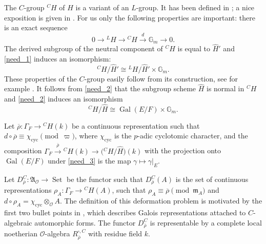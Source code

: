 \documentclass{amsart}
\theoremstyle{definition}
\theoremstyle{remark}
\DeclareMathOperator{\Gal}{Gal}
\DeclareMathOperator{\Set}{Set}
\newcommand{\Aa}{\mathfrak A}
\newcommand{\mm}{\mathfrak m}
\newcommand{\OO}{\mathcal O}
\newcommand{\rhobar}{\overline{\rho}}
\newcommand{\Gm}{\mathbb G_{m}}
\newcommand{\cyc}{\mathrm{cyc}}
\begin{document}
The $C$-group ${}^C H$ of $H$ is a variant of an $L$-group. 
It has been defined in \cite[Definition 5.3.2]{BG}; a nice exposition is given in  \cite[Section 1.1]{zhu}. For us only the following properties are important: 
there is an exact 
sequence 
\begin{equation}\label{need_1}
0\rightarrow {}^LH \rightarrow {}^CH \overset{d}{\rightarrow} \Gm\rightarrow 0.
\end{equation}
The derived subgroup of the neutral component of 
${}^C H$ is equal to $\widehat{H}'$ and \eqref{need_1} induces an isomorphism: 
\begin{equation}\label{need_2}
{}^CH/\widehat{H}'\cong {}^{L}H/\widehat{H}' \times \Gm.
\end{equation}
These properties of the $C$-group easily follow from its construction, see 
for example \cite[Section 2.1]{DPS}.
It follows from \eqref{need_2} that the subgroup scheme $\widehat{H}$ is normal in ${}^C H$ and \eqref{need_2} induces an isomorphism
\begin{equation}\label{need_3}
{}^CH/ \widehat{H}\cong \Gal(E/F)\times \Gm.
\end{equation}

Let $\rhobar: \Gamma_F\rightarrow {}^C H(k)$ be a continuous representation 
such that $d\circ \rhobar \equiv \chi_{\cyc} \pmod{\varpi}$, where $\chi_{\cyc}$ 
is the $p$-adic cyclotomic character, and the composition 
$\Gamma_F\overset{\rhobar}{\longrightarrow} {}^C H(k)\rightarrow 
\bigl({}^CH/ \widehat{H}\bigr)(k)$ with the projection onto $\Gal(E/F)$ 
under \eqref{need_3} is the map $\gamma \mapsto \gamma|_E$. 

Let $D^C_{\rhobar}: \Aa_{\OO}\rightarrow \Set$ be the functor such that 
$D^{C}_{\rhobar}(A)$ is the set of continuous representations 
$\rho_A: \Gamma_F\rightarrow {}^C H(A)$, such that 
$\rho_A\equiv \rhobar \pmod{\mm_A}$ and $d\circ \rho_A = \chi_{\cyc}\otimes_{\OO} A$. The definition of this 
deformation problem is motivated by the first two bullet points in \cite[Conjecture 5.3.4]{BG}, which  describes
Galois representations attached to $C$-algebraic automorphic forms. 
The functor $D^C_{\rhobar}$ is representable by a complete local noetherian $\OO$-algebra
$R^{\square,C}_{\rhobar}$ with residue field $k$.
\end{document}
